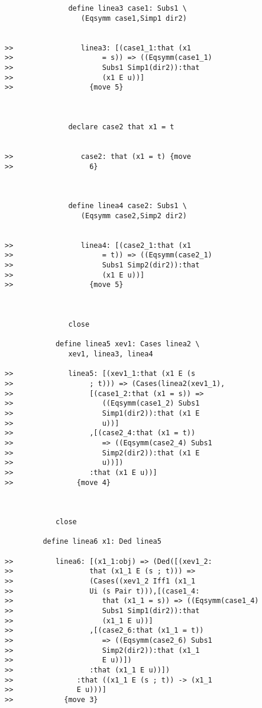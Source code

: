\documentclass[12pt]{article}
\begin{document}
\begin{verbatim}
               define linea3 case1: Subs1 \
                  (Eqsymm case1,Simp1 dir2)


>>                linea3: [(case1_1:that (x1
>>                     = s)) => ((Eqsymm(case1_1)
>>                     Subs1 Simp1(dir2)):that
>>                     (x1 E u))]
>>                  {move 5}



               declare case2 that x1 = t


>>                case2: that (x1 = t) {move
>>                  6}



               define linea4 case2: Subs1 \
                  (Eqsymm case2,Simp2 dir2)


>>                linea4: [(case2_1:that (x1
>>                     = t)) => ((Eqsymm(case2_1)
>>                     Subs1 Simp2(dir2)):that
>>                     (x1 E u))]
>>                  {move 5}



               close

            define linea5 xev1: Cases linea2 \
               xev1, linea3, linea4

>>             linea5: [(xev1_1:that (x1 E (s
>>                  ; t))) => (Cases(linea2(xev1_1),
>>                  [(case1_2:that (x1 = s)) =>
>>                     ((Eqsymm(case1_2) Subs1
>>                     Simp1(dir2)):that (x1 E
>>                     u))]
>>                  ,[(case2_4:that (x1 = t))
>>                     => ((Eqsymm(case2_4) Subs1
>>                     Simp2(dir2)):that (x1 E
>>                     u))])
>>                  :that (x1 E u))]
>>               {move 4}



            close

         define linea6 x1: Ded linea5

>>          linea6: [(x1_1:obj) => (Ded([(xev1_2:
>>                  that (x1_1 E (s ; t))) =>
>>                  (Cases((xev1_2 Iff1 (x1_1
>>                  Ui (s Pair t))),[(case1_4:
>>                     that (x1_1 = s)) => ((Eqsymm(case1_4)
>>                     Subs1 Simp1(dir2)):that
>>                     (x1_1 E u))]
>>                  ,[(case2_6:that (x1_1 = t))
>>                     => ((Eqsymm(case2_6) Subs1
>>                     Simp2(dir2)):that (x1_1
>>                     E u))])
>>                  :that (x1_1 E u))])
>>               :that ((x1_1 E (s ; t)) -> (x1_1
>>               E u)))]
>>            {move 3}




\end{verbatim}
\end{document}

